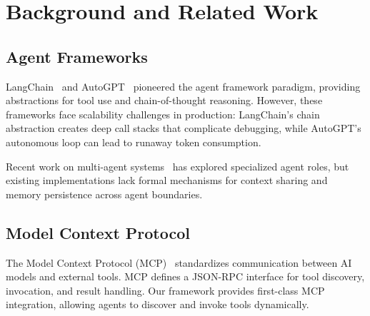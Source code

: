 \section{Background and Related Work}


\subsection{Agent Frameworks}

LangChain~\cite{langchain2022} and AutoGPT~\cite{autogpt2023} pioneered the agent framework paradigm, providing abstractions for tool use and chain-of-thought reasoning. However, these frameworks face scalability challenges in production: LangChain's chain abstraction creates deep call stacks that complicate debugging, while AutoGPT's autonomous loop can lead to runaway token consumption.

Recent work on multi-agent systems~\cite{multiagent2023} has explored specialized agent roles, but existing implementations lack formal mechanisms for context sharing and memory persistence across agent boundaries.

\subsection{Model Context Protocol}

The Model Context Protocol (MCP)~\cite{mcp2022} standardizes communication between AI models and external tools. MCP defines a JSON-RPC interface for tool discovery, invocation, and result handling. Our framework provides first-class MCP integration, allowing agents to discover and invoke tools dynamically.

